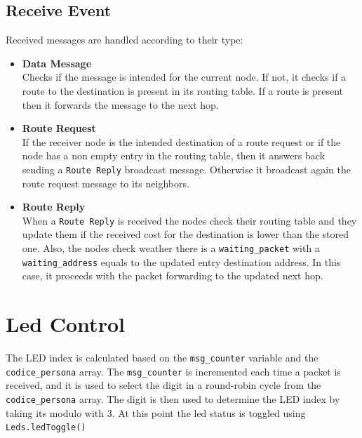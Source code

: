 \documentclass[11pt]{article}
\begin{document}
\subsection*{Receive Event}
Received messages are handled according to their type:
\begin{itemize}
	\item{\textbf{Data Message}}\\
		Checks if the message is intended for the current node. If not, it checks if a route to the destination is present in its routing table. If a route is present then it forwards the message to the next hop.
	\item{\textbf{Route Request}}\\
		If the receiver node is the intended destination of a route request or if the node has a non empty entry in the routing table, then it answers back sending a \texttt{Route Reply} broadcast message.
		Otherwise it broadcast again the route request message to its neighbors.
		
	\item{\textbf{Route Reply}}\\
		When a \texttt{Route Reply} is received the nodes check their routing table and they update them if the received cost for the destination is lower than the stored one.
		Also, the nodes check weather there is a \texttt{waiting\_packet} with a \texttt{waiting\_address} equals to the updated entry destination address.
		In this case, it proceeds with the packet forwarding to the updated next hop.
\end{itemize}
\section*{Led Control}
The LED index is calculated based on the \texttt{msg\_counter} variable and the \texttt{codice\_persona} array. The \texttt{msg\_counter} is incremented each time a packet is received, and it is used to select the digit in a round-robin cycle from the \texttt{codice\_persona} array. The digit is then used to determine the LED index by taking its modulo with 3. At this point the led status is toggled using \texttt{Leds.ledToggle()}
\end{document}
